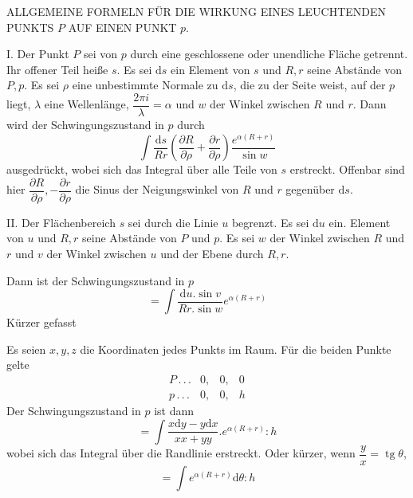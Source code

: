 \begin{center}ALLGEMEINE FORMELN FÜR DIE WIRKUNG EINES LEUCHTENDEN PUNKTS $P$ AUF EINEN PUNKT $p$.\end{center}
I. Der Punkt $P$ sei von $p$ durch eine geschlossene oder unendliche Fläche getrennt. Ihr offener Teil heiße $s$. Es sei $\mathrm ds$ ein Element von $s$ und $R,r$ seine Abstände von $P,p$. Es sei $\rho$ eine unbestimmte Normale zu $\mathrm ds$, die zu der Seite weist, auf der $p$ liegt, $\lambda$ eine Wellenlänge, $\dfrac{2\pi i}{\lambda}=\alpha$ und $w$ der Winkel zwischen $R$ und $r$. Dann wird der Schwingungszustand in $p$ durch
\[
\int\frac{\mathrm ds}{Rr}\left(\frac{\partial R}{\partial\rho}+\frac{\partial r}{\partial\rho}\right)\frac{e^{\alpha(R+r)}}{\sin w}
\]
ausgedrückt, wobei sich das Integral über alle Teile von $s$ erstreckt. Offenbar sind hier $\dfrac{\partial R}{\partial\rho},-\dfrac{\partial r}{\partial\rho}$ die Sinus der Neigungswinkel von $R$ und $r$ gegenüber $\mathrm ds$.

II. Der Flächenbereich $s$ sei durch die Linie $u$ begrenzt. Es sei $\mathrm du$ ein. Element von $u$ und $R,r$ seine Abstände von $P$ und $p$. Es sei $w$ der Winkel zwischen $R$ und $r$ und $v$ der Winkel zwischen $u$ und der Ebene durch $R,r$.

Dann ist der Schwingungszustand in $p$
\[
=\int\frac{\mathrm du.\sin v}{Rr.\sin w}e^{\alpha(R+r)}
\]
Kürzer gefasst

Es seien $x,y,z$ die Koordinaten jedes Punkts im Raum. Für die beiden Punkte gelte
\[
\begin{array}{lccc}
P\, .\, .\, .&0,&0,&0\\
p\, .\, .\, .&0,&0,&h
\end{array}
\]
Der Schwingungszustand in $p$ ist dann
\[
=\int\frac{x\mathrm dy-y\mathrm dx}{xx+yy}.e^{\alpha(R+r)}:h
\]
wobei sich das Integral über die Randlinie erstreckt. Oder kürzer, wenn $\dfrac yx=\operatorname{tg}\theta$,
\[
=\int e^{\alpha(R+r)}\mathrm d\theta:h
\]

